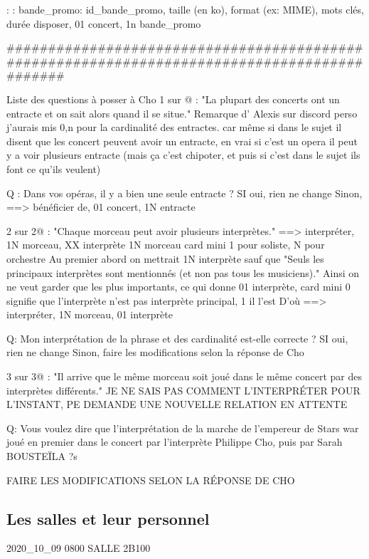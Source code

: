 \documentclass[12pt,a4paper]{article}
\begin{document}
{:
:
bande_promo: id_bande_promo, taille (en ko), format (ex: MIME), mots clés, durée 
disposer, 01 concert, 1n bande_promo

#############################################################################################







Liste des questions à posser à Cho
1 sur @ : "La plupart des concerts ont un entracte et on sait alors quand il se situe."
Remarque d' Alexis sur discord
perso j'aurais mis 0,n pour la cardinalité des entractes. car même si dans le sujet il disent que les concert peuvent avoir un entracte, en vrai si c'est un opera il peut y a voir plusieurs entracte (mais ça c'est chipoter, et puis si c'est dans le sujet ils font ce qu'ils veulent)

Q : Dans vos opéras, il y a bien une seule entracte ?
SI oui, rien ne change
Sinon, ==>  bénéficier de, 01 concert, 1N entracte



2 sur 2@ : "Chaque morceau peut avoir plusieurs interprètes."
==> interpréter, 1N morceau, XX interprète
1N morceau card mini 1 pour soliste, N pour orchestre
Au premier abord on mettrait 1N interprète sauf que
"Seuls les principaux interprètes sont mentionnés (et non pas tous les musiciens)."
Ainsi on ne veut garder que les plus importants, ce qui donne
01 interprète, card mini 0 signifie que l'interprète n'est pas interprète principal, 1 il l'est
D'où ==> interpréter, 1N morceau, 01 interprète

Q: Mon interprétation de la phrase et des cardinalité est-elle correcte ?
SI oui, rien ne change
Sinon, faire les modifications selon la réponse de Cho



3 sur 3@ : "Il arrive que le même morceau soit joué dans le même concert par des interprètes différents."
JE NE SAIS PAS COMMENT L'INTERPRÉTER POUR L'INSTANT, PE DEMANDE UNE NOUVELLE RELATION
EN ATTENTE

Q: Vous voulez dire que l'interprétation de la marche de l'empereur de Stars war joué en premier
dans le concert par l'interprète Philippe Cho, puis par Sarah BOUSTEÏLA ?s

FAIRE LES MODIFICATIONS SELON LA RÉPONSE DE CHO





\subsection{Les salles et leur personnel}
2020_10_09 0800 SALLE 2B100


}
\end{document}
